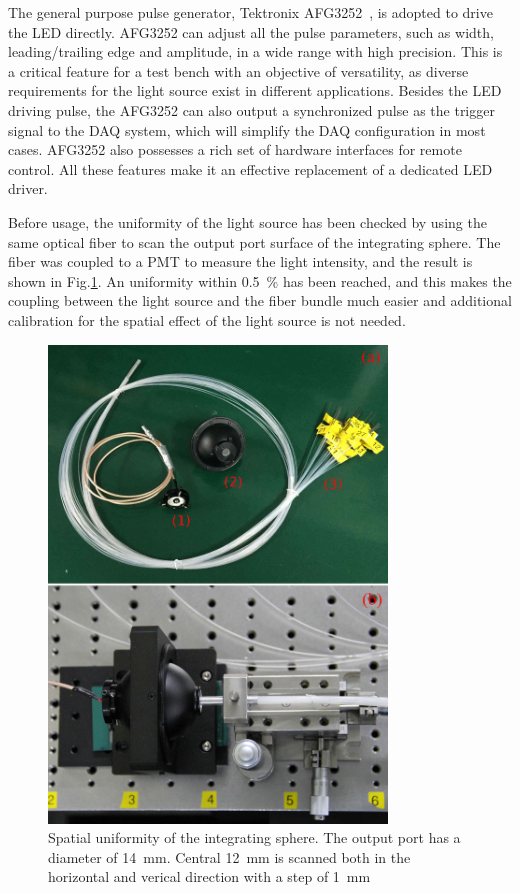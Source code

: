 \documentclass[review, times]{elsarticle}
\begin{document}
The general purpose pulse generator, Tektronix AFG3252~\cite{afg3252}, is adopted to drive the LED directly.
AFG3252 can adjust all the pulse parameters, such as width, leading/trailing edge and amplitude, in a wide range with high precision. This is a critical feature for a test bench with an objective of versatility, as diverse requirements for the light source exist in different applications. 
Besides the LED driving pulse, the AFG3252 can also output a synchronized pulse as the trigger signal to the DAQ system, which will simplify the DAQ configuration in most cases. 
AFG3252 also possesses a rich set of hardware interfaces for remote control. All these features make it an effective replacement of a dedicated LED driver. 

Before usage, the uniformity of the light source has been checked by using the same optical fiber to scan the output port surface of the integrating sphere. The fiber was coupled to a PMT to measure the light intensity, and the result is shown in Fig.\ref{fig:FIG3}. An uniformity within \textpm\SI{0.5}{\percent} has been reached, and this makes the coupling between the light source and the fiber bundle much easier and additional calibration for the spatial effect of the light source is not needed. 

\begin{figure}
 \centering
 \includegraphics[width=90mm]{FIG3}
\caption{Spatial uniformity of the integrating sphere.
The output port has a diameter of \SI{14}{\milli\meter}.
Central \SI{12}{\milli\meter} is scanned both in the horizontal and verical direction with a step of \SI{1}{\milli\meter}}
\label{fig:FIG3}
\end{figure} 
\end{document}
